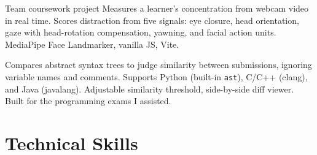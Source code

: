 \documentclass[small]{cv}
\begin{document}
  {Team coursework project}
  {}
  {Measures a learner's concentration from webcam video in real time. Scores distraction
   from five signals: eye closure, head orientation, gaze with head-rotation compensation,
   yawning, and facial action units. MediaPipe Face Landmarker, vanilla JS, Vite.}

  {}
  {Compares abstract syntax trees to judge similarity between submissions, ignoring
   variable names and comments. Supports Python (built-in \texttt{ast}), C/C++ (clang),
   and Java (javalang). Adjustable similarity threshold, side-by-side diff viewer.
   Built for the programming exams I assisted.}


\section{Technical Skills}

\end{document}
